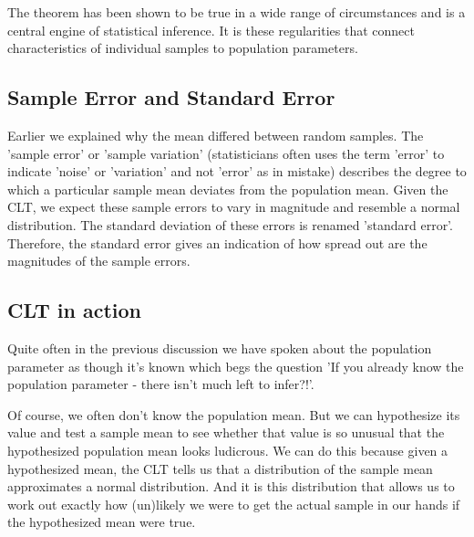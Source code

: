 \documentclass{article}
\begin{document}
The theorem has been shown to be true in a wide range of circumstances and is a central engine of statistical inference. It is these regularities that connect characteristics of individual samples to population parameters.

\subsection{Sample Error and Standard Error}

Earlier we explained why the mean differed between random samples. The 'sample error' or 'sample variation' (statisticians often uses the term 'error' to indicate 'noise' or 'variation' and not 'error' as in mistake) describes the degree to which a particular sample mean deviates from the population mean. Given the CLT, we expect these sample errors to vary in magnitude and resemble a normal distribution. The standard deviation of these errors is renamed 'standard error'. Therefore, the standard error gives an indication of how spread out are the magnitudes of the sample errors.

\subsection{CLT in action}
Quite often in the previous discussion we have spoken about the population parameter as though it's known which begs the question 'If you already know the population parameter - there isn't much left to infer?!'. 

Of course, we often don't know the population mean. But we can hypothesize its value and test a sample mean to see whether that value is so unusual that the hypothesized population mean looks ludicrous. We can do this because given a hypothesized mean, the CLT tells us that a distribution of the sample mean approximates a normal distribution. And it is this distribution that allows us to work out exactly how (un)likely we were to get the actual sample in our hands if the hypothesized mean were true. 
\end{document}
